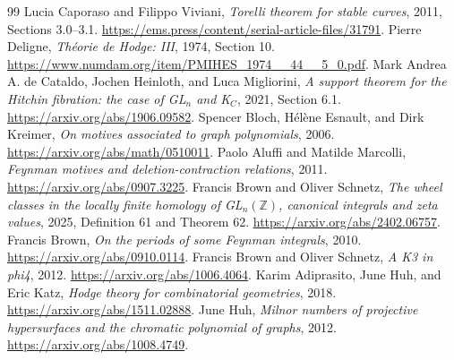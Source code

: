 \documentclass[11pt]{article}
\theoremstyle{definition}
\theoremstyle{remark}
\newcommand{\Z}{\mathbb Z}
\begin{document}
\begin{thebibliography}{99}
 Lucia Caporaso and Filippo Viviani, \emph{Torelli theorem for stable curves}, 2011, Sections 3.0--3.1. \url{https://ems.press/content/serial-article-files/31791}.
 Pierre Deligne, \emph{Th\'eorie de Hodge: III}, 1974, Section 10. \url{https://www.numdam.org/item/PMIHES_1974__44__5_0.pdf}.
 Mark Andrea A. de Cataldo, Jochen Heinloth, and Luca Migliorini, \emph{A support theorem for the Hitchin fibration: the case of GL\(_n\) and K\(_C\)}, 2021, Section 6.1. \url{https://arxiv.org/abs/1906.09582}.
 Spencer Bloch, H\'el\`ene Esnault, and Dirk Kreimer, \emph{On motives associated to graph polynomials}, 2006. \url{https://arxiv.org/abs/math/0510011}.
 Paolo Aluffi and Matilde Marcolli, \emph{Feynman motives and deletion-contraction relations}, 2011. \url{https://arxiv.org/abs/0907.3225}.
 Francis Brown and Oliver Schnetz, \emph{The wheel classes in the locally finite homology of GL\(_n(\Z)\), canonical integrals and zeta values}, 2025, Definition 61 and Theorem 62. \url{https://arxiv.org/abs/2402.06757}.
 Francis Brown, \emph{On the periods of some Feynman integrals}, 2010. \url{https://arxiv.org/abs/0910.0114}.
 Francis Brown and Oliver Schnetz, \emph{A K3 in phi4}, 2012. \url{https://arxiv.org/abs/1006.4064}.
 Karim Adiprasito, June Huh, and Eric Katz, \emph{Hodge theory for combinatorial geometries}, 2018. \url{https://arxiv.org/abs/1511.02888}.
 June Huh, \emph{Milnor numbers of projective hypersurfaces and the chromatic polynomial of graphs}, 2012. \url{https://arxiv.org/abs/1008.4749}.
\end{thebibliography}
\end{document}
